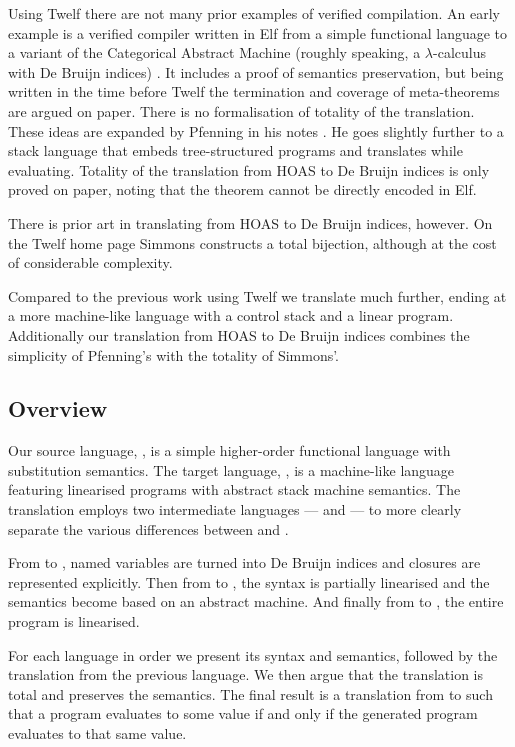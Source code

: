 Using Twelf there are not many prior examples of verified compilation.
An early example is a verified compiler written in Elf from a simple functional language to a variant of the Categorical Abstract Machine (roughly speaking, a $\lambda$-calculus with De Bruijn indices) \cite{Hannan92}.
It includes a proof of semantics preservation, but being written in the time before Twelf the termination and coverage of meta-theorems are argued on paper.
There is no formalisation of totality of the translation.
These ideas are expanded by Pfenning in his notes \cite[ch. 6]{Pfenning01}.
He goes slightly further to a stack language that embeds tree-structured programs and translates while evaluating.
Totality of the translation from HOAS to De Bruijn indices is only proved on paper, noting that the theorem cannot be directly encoded in Elf.

There is prior art in translating from HOAS to De Bruijn indices, however.
On the Twelf home page Simmons \cite{Simmons07} constructs a total bijection, although at the cost of considerable complexity.

Compared to the previous work using Twelf we translate much further, ending at a more machine-like language with a control stack and a linear program.
Additionally our translation from HOAS to De Bruijn indices combines the simplicity of Pfenning's with the totality of Simmons'.


\subsection{Overview}

Our source language, \hlang, is a simple higher-order functional language with substitution semantics.
The target language, \mlang, is a machine-like language featuring linearised programs with abstract stack machine semantics.
The translation employs two intermediate languages --- \blang and \slang --- to more clearly separate the various differences between \hlang and \mlang.

From \hlang to \blang, named variables are turned into De Bruijn indices and closures are represented explicitly.
Then from \blang to \slang, the syntax is partially linearised and the semantics become based on an abstract machine.
And finally from \slang to \mlang, the entire program is linearised.

For each language in order we present its syntax and semantics, followed by the translation from the previous language.
We then argue that the translation is total and preserves the semantics.
The final result is a translation from \hlang to \mlang such that a \hlang program evaluates to some value if and only if the generated \mlang program evaluates to that same value.

